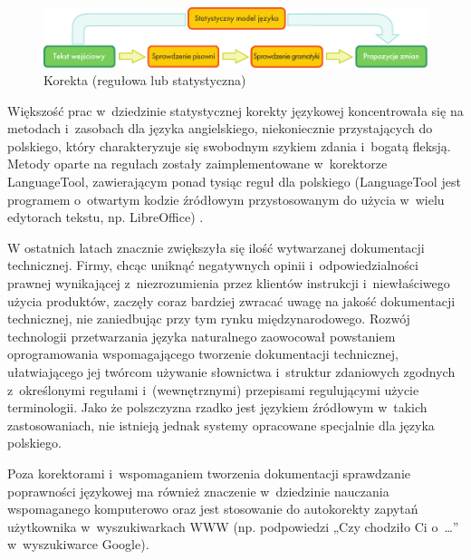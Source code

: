 \begin{multicols}{2}
\begin{figure}[t]  \center
\includegraphics[width=\textwidth]{../_media/polish/language_checking}
\caption{Korekta (regułowa lub statystyczna)} \label{fig:langcheckingaarch_pl} 
\end{figure} 

Większość prac w~dziedzinie statystycznej korekty językowej
koncentrowała się na metodach i~zasobach dla języka angielskiego,
niekoniecznie przystających do polskiego, który charakteryzuje się
swobodnym szykiem zdania i~bogatą fleksją. Metody oparte na
regułach zostały zaimplementowane w~korektorze LanguageTool,
zawierającym ponad tysiąc reguł dla polskiego (LanguageTool jest
programem o~otwartym kodzie źródłowym przystosowanym do użycia
w~wielu edytorach tekstu, np. LibreOffice) \cite{lto1, Mikowski2010}. 


W ostatnich latach znacznie zwiększyła się ilość wytwarzanej
dokumentacji technicznej. Firmy, chcąc uniknąć negatywnych opinii
i~odpowiedzialności prawnej wynikającej z~niezrozumienia przez
klientów instrukcji i~niewłaściwego użycia produktów, zaczęły
coraz bardziej zwracać uwagę na jakość dokumentacji technicznej,
nie zaniedbując przy tym rynku międzynarodowego. Rozwój technologii
przetwarzania języka naturalnego zaowocował powstaniem
oprogramowania wspomagającego tworzenie dokumentacji technicznej,
ułatwiającego jej twórcom używanie słownictwa i~struktur
zdaniowych zgodnych z~określonymi regułami i~(wewnętrznymi)
przepisami regulującymi użycie terminologii. Jako że polszczyzna
rzadko jest językiem źródłowym w~takich zastosowaniach, nie
istnieją jednak systemy opracowane specjalnie dla języka polskiego. 

Poza korektorami i~wspomaganiem tworzenia dokumentacji sprawdzanie
poprawności językowej ma również znaczenie w~dziedzinie nauczania
wspomaganego komputerowo oraz jest stosowanie do autokorekty zapytań
użytkownika w~wyszukiwarkach WWW (np. podpowiedzi „Czy chodziło Ci
o~\ldots{}” w~wyszukiwarce Google). 


\end{multicols}
